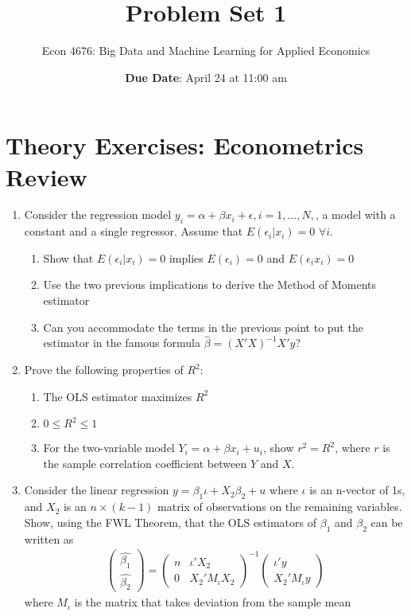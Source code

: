 \documentclass[12pt,onecolumn]{article}
\title{Problem Set 1}
\subtitle{Econ 4676: Big Data and Machine Learning for Applied Economics}
\author{{\bf Due Date}: April 24 at 11:00 am}
\date{}
\begin{document}
\maketitle

\section{Theory Exercises: Econometrics Review}

\begin{enumerate}

  \item Consider the regression model $y_i = \alpha +\beta x_i +\epsilon, i=1,...,N,$, a model with a constant and a single regressor. Assume that $E(\epsilon_i|x_i)=0$ $\forall i$.
      \begin{enumerate}
        \item Show that $E(\epsilon_i|x_i)=0$ implies  $E(\epsilon_i)=0$ and  $E(\epsilon_i x_i)=0$
        \item Use the two previous implications to derive the Method of Moments estimator
        \item Can you accommodate the terms in the previous point to put the estimator in the famous formula $\hat \beta= (X'X)^{-1}X'y$?
      \end{enumerate}
  \item Prove the following properties of $R^2$:
        \begin{enumerate}
              \item The OLS estimator maximizes $R^2$
              \item $0 \leq R^2 \leq 1$
              \item For the two-variable model $Y_i = \alpha + \beta x_i + u_i$, show $r^2 = R^2$, where $r$ is the sample correlation coefficient between $Y$ and $X$.
    \end{enumerate}
    
    
  \item Consider the linear regression $y = \beta_1 \iota + X_2 \beta_2 +u$ where $\iota$ is an n-vector of 1s, and $X_2$ is an $n \times (k-1)$ matrix of observations on the remaining variables. Show, using the FWL Theorem, that the OLS estimators of $\beta_1$ and $\beta_2$ can be written as
  \begin{align}
  \left(\begin{array}{c}
    \hat{\beta_{1}}\\
    \hat{\beta_{2}}
    \end{array}\right)=\left(\begin{array}{cc}
    n & \iota'X_{2}\\
    0 & X_{2}'M_{\iota}X_{2}
    \end{array}\right)^{-1}\left(\begin{array}{c}
    \iota' y\\
    X_{2}'M_{\iota}y
    \end{array}\right)
  \end{align}
  where $M_{\iota}$ is the matrix that takes deviation from the sample mean


\end{enumerate}
\end{document}
